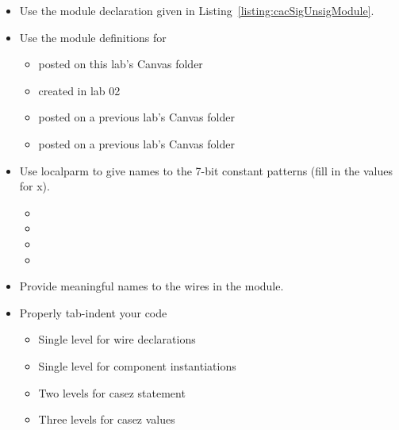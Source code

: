     \begin{itemize}
        \item
            Use the module declaration given in Listing~\ref{listing:cacSigUnsigModule}.
        \item
            Use the module definitions for

            \begin{itemize}
                \item
                     posted on this lab's Canvas folder
                \item
                     created in lab 02
                \item
                     posted on a previous lab's Canvas folder
                \item
                     posted on a previous lab's Canvas folder
            \end{itemize}
        \item
            Use localparm to give names to the 7-bit constant patterns (fill in
            the values for x).

            \begin{itemize}
                \item
                \item
                \item
                \item
            \end{itemize}
        \item
            Provide meaningful names to the wires in the module.
        \item
            Properly tab-indent your code

            \begin{itemize}
                \item
                    Single level for wire declarations
                \item
                    Single level for component instantiations
                \item
                    Two levels for casez statement
                \item
                    Three levels for casez values
            \end{itemize}
    \end{itemize}

